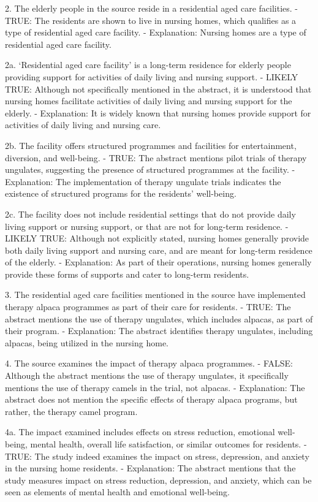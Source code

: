 \documentclass{article}
\begin{document}
\begin{description}
  2. The elderly people in the source reside in a residential aged care
  facilities. - TRUE: The residents are shown to live in nursing homes, which
  qualifies as a type of residential aged care facility. - Explanation: Nursing
  homes are a type of residential aged care facility.

  2a. `Residential aged care facility' is a long-term residence for elderly
  people providing support for activities of daily living and nursing support.
  - LIKELY TRUE: Although not specifically mentioned in the abstract, it is
  understood that nursing homes facilitate activities of daily living and
  nursing support for the elderly. - Explanation: It is widely known that
  nursing homes provide support for activities of daily living and nursing
  care.

  2b. The facility offers structured programmes and facilities for
  entertainment, diversion, and well-being. - TRUE: The abstract mentions pilot
  trials of therapy ungulates, suggesting the presence of structured programmes
  at the facility. - Explanation: The implementation of therapy ungulate trials
  indicates the existence of structured programs for the residents' well-being.

  2c. The facility does not include residential settings that do not provide
  daily living support or nursing support, or that are not for long-term
  residence. - LIKELY TRUE: Although not explicitly stated, nursing homes
  generally provide both daily living support and nursing care, and are meant
  for long-term residence of the elderly. - Explanation: As part of their
  operations, nursing homes generally provide these forms of supports and cater
  to long-term residents.

  3. The residential aged care facilities mentioned in the source have
  implemented therapy alpaca programmes as part of their care for residents. -
  TRUE: The abstract mentions the use of therapy ungulates, which includes
  alpacas, as part of their program. - Explanation: The abstract identifies
  therapy ungulates, including alpacas, being utilized in the nursing home.

  4. The source examines the impact of therapy alpaca programmes. - FALSE:
  Although the abstract mentions the use of therapy ungulates, it specifically
  mentions the use of therapy camels in the trial, not alpacas. - Explanation:
  The abstract does not mention the specific effects of therapy alpaca
  programs, but rather, the therapy camel program.

  4a. The impact examined includes effects on stress reduction, emotional
  well-being, mental health, overall life satisfaction, or similar outcomes for
  residents. - TRUE: The study indeed examines the impact on stress,
  depression, and anxiety in the nursing home residents. - Explanation: The
  abstract mentions that the study measures impact on stress reduction,
  depression, and anxiety, which can be seen as elements of mental health and
  emotional well-being.


\end{description}
\end{document}
